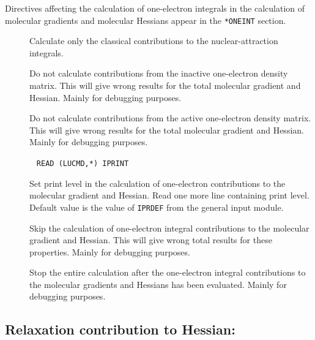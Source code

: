 Directives affecting the calculation of one-electron integrals in the
calculation of molecular gradients and molecular
Hessians appear in the 
\verb|*ONEINT| section. 
\begin{description}
\item[] Calculate only the classical contributions to the
nuclear-attraction integrals.

\item[] Do not calculate contributions from the inactive
one-electron density matrix. This will give wrong results for the
total molecular gradient and
Hessian. Mainly for debugging
purposes. 

\item[] Do not calculate contributions from the active
one-electron density matrix. This will give wrong results for the
total molecular gradient and Hessian. Mainly for debugging purposes.

\item[]\verb| |\newline
\verb|READ (LUCMD,*) IPRINT|

 Set print level in the calculation of one-electron contributions to
the molecular gradient and Hessian.  Read one more line containing
print level. Default value is the value of \verb|IPRDEF| from the
general input module.

\item[] Skip the calculation of one-electron integral
contributions to the molecular gradient and Hessian. This will give
wrong total results for these properties. Mainly for debugging
purposes.

\item[] Stop the entire calculation after the
one-electron integral contributions to the molecular gradients and
Hessians has been evaluated. Mainly for debugging purposes.
\end{description}

\subsection{Relaxation contribution to Hessian: }


